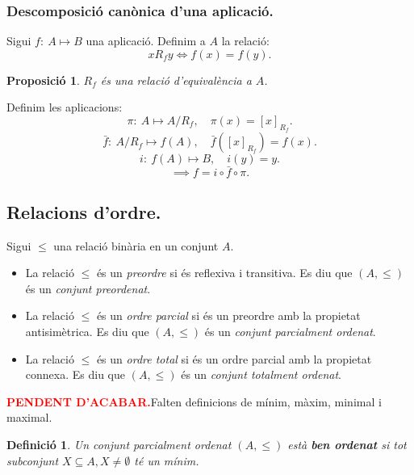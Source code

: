 \documentclass[11pt]{article}
\newtheorem{defi}{Definició}[section]
\newtheorem{prop}{Proposició}[section]
\newcommand{\pendent}{\textcolor{red}{\textbf{PENDENT D'ACABAR.}}}
\begin{document}
\subsubsection{Descomposició canònica d'una aplicació.}
Sigui $f:\ A\mapsto B$ una aplicació. Definim a $A$ la relació:
$$xR_fy\iff f(x)=f(y).$$
\begin{prop}
$R_f$ és una relació d'equivalència a $A$.
\end{prop}
\noindent Definim les aplicacions:
\begin{equation}
\pi:\ A\mapsto A/R_f,\quad\pi(x)=[x]_{R_f}.
\end{equation}
\begin{equation}
\bar{f}:\ A/R_f\mapsto f(A),\quad\bar{f}([x]_{R_f})=f(x).
\end{equation}
\begin{equation}
i:\ f(A)\mapsto B,\quad i(y)=y.
\end{equation}
$$\implies f=i\circ\bar{f}\circ\pi.$$
\subsection{Relacions d'ordre.}
Sigui $\leq$ una relació binària en un conjunt $A$.
\begin{itemize}
	\item La relació $\leq$ és un \textit{preordre} si és reflexiva i transitiva. Es diu que $(A,\leq)$ és un \textit{conjunt preordenat}.
	\item La relació $\leq$ és un \textit{ordre parcial} si és un preordre amb la propietat antisimètrica. Es diu que $(A,\leq)$ és un \textit{conjunt parcialment ordenat}.
	\item La relació $\leq$ és un \textit{ordre total} si és un ordre parcial amb la propietat connexa. Es diu que $(A,\leq)$ és un \textit{conjunt totalment ordenat}.
\end{itemize}
\pendent Falten definicions de mínim, màxim, minimal i maximal.
\noindent
\begin{defi}
Un conjunt parcialment ordenat $(A,\leq)$ està \textbf{ben ordenat} si tot subconjunt $X\subseteq A,X\neq\emptyset$ té un mínim.
\end{defi}
\end{document}
